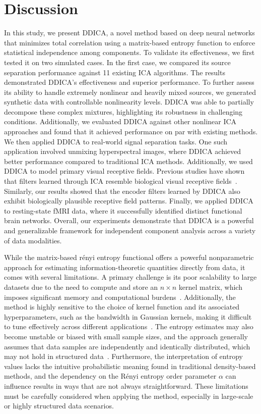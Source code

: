 \documentclass{article}
\begin{document}
\section{Discussion}
\hspace{1.2em} In this study, we present DDICA, a novel method based on deep neural networks that minimizes total correlation using a matrix-based entropy function to enforce statistical independence among components. To validate its effectiveness, we first tested it on two simulated cases. In the first case, we compared its source separation performance against 11 existing ICA algorithms. The results demonstrated DDICA's effectiveness and superior performance. To further assess its ability to handle extremely nonlinear and heavily mixed sources, we generated synthetic data with controllable nonlinearity levels. DDICA was able to partially decompose these complex mixtures, highlighting its robustness in challenging conditions. Additionally, we evaluated DDICA against other nonlinear ICA approaches and found that it achieved performance on par with existing methods. We then applied DDICA to real-world signal separation tasks. One such application involved unmixing hyperspectral images, where DDICA achieved better performance compared to traditional ICA methods. Additionally, we used DDICA to model primary visual receptive fields. Previous studies have shown that filters learned through ICA resemble biological visual receptive fields~\cite{Hateren99,Hyvarinen2009}. Similarly, our results showed that the encoder filters learned by DDICA also exhibit biologically plausible receptive field patterns. Finally, we applied DDICA to resting-state fMRI data, where it successfully identified distinct functional brain networks. Overall, our experiments demonstrate that DDICA is a powerful and generalizable framework for independent component analysis across a variety of data modalities.

While the matrix-based rényi entropy functional offers a powerful nonparametric approach for estimating information-theoretic quantities directly from data, it comes with several limitations. A primary challenge is its poor scalability to large datasets due to the need to compute and store an \( n \times n \) kernel matrix, which imposes significant memory and computational burdens~\cite{Gong22}. Additionally, the method is highly sensitive to the choice of kernel function and its associated hyperparameters, such as the bandwidth in Gaussian kernels, making it difficult to tune effectively across different applications~\cite{Yu2019,giraldo2014measures}. The entropy estimates may also become unstable or biased with small sample sizes, and the approach generally assumes that data samples are independently and identically distributed, which may not hold in structured data~\cite{cover1991information}. Furthermore, the interpretation of entropy values lacks the intuitive probabilistic meaning found in traditional density-based methods, and the dependency on the Rényi entropy order parameter \( \alpha \) can influence results in ways that are not always straightforward. These limitations must be carefully considered when applying the method, especially in large-scale or highly structured data scenarios.
\end{document}
